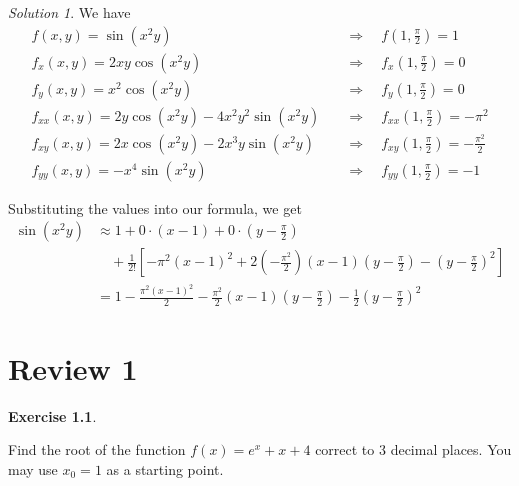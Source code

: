 \documentclass[
]{book}
\theoremstyle{definition}
\theoremstyle{definition}
\theoremstyle{definition}
\newtheorem{exercise}{Exercise}[chapter]
\theoremstyle{definition}
\theoremstyle{remark}
\newtheorem*{solution}{Solution}
\begin{document}
\begin{solution}

We have
\begin{align*}
f(x,y) = \sin(x^2y) \quad & \Rightarrow \quad f\left(1,\frac{\pi}{2}\right )=1\\
f_x(x,y) = 2xy\cos(x^2y) \quad & \Rightarrow \quad f_x\left(1,\frac{\pi}{2}\right )=0 \\
f_y(x,y) = x^2\cos(x^2y) \quad & \Rightarrow \quad f_y\left(1,\frac{\pi}{2}\right )=0 \\ 
f_{xx}(x,y) = 2y\cos(x^2y)-4x^2y^2\sin(x^2y) \quad & \Rightarrow \quad f_{xx}\left(1,\frac{\pi}{2}\right )= -\pi^2\\
f_{xy}(x,y) = 2x\cos(x^2y)-2x^3y\sin(x^2y) \quad & \Rightarrow \quad f_{xy}\left(1,\frac{\pi}{2}\right )= -\frac{\pi^2}{2}\\
f_{yy}(x,y) = -x^4\sin(x^2y) \quad & \Rightarrow \quad f_{yy}\left(1,\frac{\pi}{2}\right )= -1
\end{align*}

Substituting the values into our formula, we get
\begin{align*}
\sin(x^2y) & \approx 1+ 0\cdot(x-1)+0\cdot \left(y-\frac{\pi}{2}\right)\\ & \quad +\frac{1}{2!}\left[-\pi^2(x-1)^2+2\left(-\frac{\pi^2}{2}\right)(x-1)\left(y-\frac{\pi}{2}\right) - \left(y-\frac{\pi}{2}\right)^2\right]\\
&= 1 -\frac{\pi^2(x-1)^2}{2}-\frac{\pi^2}{2}(x-1)\left(y-\frac{\pi}{2}\right) -\frac{1}{2}\left(y-\frac{\pi}{2}\right)^2
\end{align*}

\end{solution}

\hypertarget{lec-35}{%
\chapter{Review 1}\label{lec-35}}

\begin{exercise}
\protect\hypertarget{exr:unlabeled-div-267}{}\label{exr:unlabeled-div-267}

Find the root of the function \(f(x) = e^x + x + 4\) correct to 3 decimal places. You may use \(x_0=1\) as a starting point.

\end{exercise}
\end{document}
